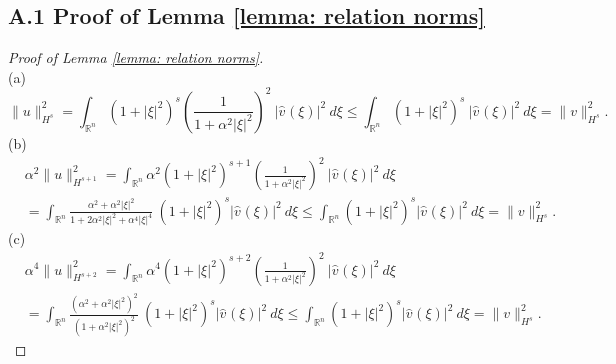 \documentclass{amsart}
\begin{document}
\subsection*{A.1 Proof of Lemma \ref{lemma: relation norms}}
\label{subsection: relation between norms}
 \begin{proof}[Proof of Lemma \ref{lemma: relation norms}]\ \\
 (a)
$$\|u\|_{H^s}^2 =  \int_{\mathbb{R}^n} (1+|\xi|^2)^{s}\left(\frac{1}{1+\alpha^2|\xi|^2}\right)^2\ |\hat{v}^{}(\xi)|^2 \ d\xi \leq  \int_{\mathbb{R}^n} (1+|\xi|^2)^{s} \ |\hat{v}^{}(\xi)|^2 \ d\xi = \|v\|_{H^s}^2. $$
(b)
\begin{equation*}
\begin{aligned}
&\alpha^2\|u\|_{H^{s+1}}^2  = \int_{\mathbb{R}^n} \alpha^2(1+|\xi|^2)^{s+1}\left(\frac{1}{1+\alpha^2|\xi|^2}\right)^2\ |\hat{v}^{}(\xi)|^2 \ d\xi \\
&=    \int_{\mathbb{R}^n} \frac{\alpha^2+ \alpha^2|\xi|^2}{1+2\alpha^2|\xi|^2 + \alpha^4|\xi|^4}\ (1+|\xi|^2)^{s} |\hat{v}^{}(\xi)|^2 \ d\xi \leq \int_{\mathbb{R}^n}  (1+|\xi|^2)^{s} |\hat{v}^{}(\xi)|^2 \ d\xi = \|v\|_{H^s}^2.
\end{aligned}
\end{equation*}
(c)
\begin{equation*}
\begin{aligned}
&\alpha^4\|u\|_{H^{s+2}}^2 = \int_{\mathbb{R}^n} \alpha^4(1+|\xi|^2)^{s+2}\left(\frac{1}{1+\alpha^2|\xi|^2}\right)^2\ |\hat{v}^{}(\xi)|^2 \ d\xi \\
&=  \int_{\mathbb{R}^n} \frac{(\alpha^2+ \alpha^2|\xi|^2)^2}{(1+\alpha^2|\xi|^2)^2}\ (1+|\xi|^2)^{s} |\hat{v}^{}(\xi)|^2 \ d\xi \leq \int_{\mathbb{R}^n}  (1+|\xi|^2)^{s} |\hat{v}^{}(\xi)|^2 \ d\xi = \|v\|_{H^s}^2.
\end{aligned}
\end{equation*}
\end{proof}
\end{document}
